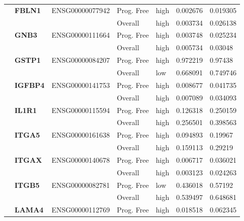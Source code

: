 \begin{spacing}{1}
{\begin{longtable}{|>{\bfseries}p{2cm}|>{\bfseries}p{1.9cm}|p{2.8cm}|p{2cm}|p{2cm}|p{1.5cm}|p{1.5cm}|}
             & FBLN1    & ENSG00000077942 & Prog. Free & high & 0.002676 & 0.019305 \\
            \hhline{~~~----}
             &          &                 & Overall    & high & 0.003734 & 0.026138 \\
            \hhline{~======}
             & GNB3     & ENSG00000111664 & Prog. Free & high & 0.003748 & 0.025234 \\
            \hhline{~~~----}
             &          &                 & Overall    & high & 0.005734 & 0.03048  \\
            \hhline{~======}
             & GSTP1    & ENSG00000084207 & Prog. Free & high & 0.972219 & 0.97438  \\
            \hhline{~~~----}
             &          &                 & Overall    & low  & 0.668091 & 0.749746 \\
            \hhline{~======}
             & IGFBP4   & ENSG00000141753 & Prog. Free & high & 0.008677 & 0.041735 \\
            \hhline{~~~----}
             &          &                 & Overall    & high & 0.007089 & 0.034093 \\
            \hhline{~======}
             & IL1R1    & ENSG00000115594 & Prog. Free & high & 0.126318 & 0.250159 \\
            \hhline{~~~----}
             &          &                 & Overall    & high & 0.256501 & 0.398563 \\
            \hhline{~======}
             & ITGA5    & ENSG00000161638 & Prog. Free & high & 0.094893 & 0.19967  \\
            \hhline{~~~----}
             &          &                 & Overall    & high & 0.159113 & 0.29219  \\
            \hhline{~======}
             & ITGAX    & ENSG00000140678 & Prog. Free & high & 0.006717 & 0.036021 \\
            \hhline{~~~----}
             &          &                 & Overall    & high & 0.003123 & 0.024263 \\
            \hhline{~======}
             & ITGB5    & ENSG00000082781 & Prog. Free & low  & 0.436018 & 0.57192  \\
            \hhline{~~~----}
             &          &                 & Overall    & high & 0.539497 & 0.648681 \\
            \hhline{~======}
             & LAMA4    & ENSG00000112769 & Prog. Free & high & 0.018518 & 0.062345 \\

\end{longtable}}
\end{spacing}

